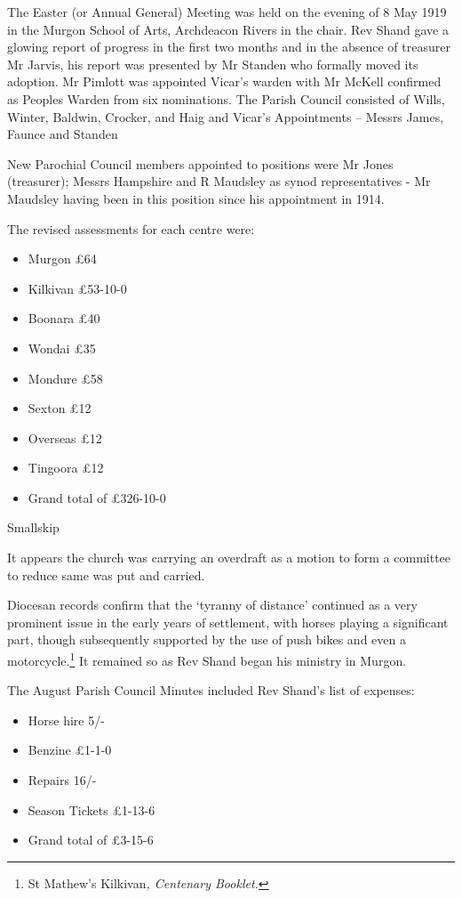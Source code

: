 The Easter (or Annual General) Meeting was held on the evening of 8 May 1919 in the Murgon School of Arts, Archdeacon Rivers in the chair. Rev Shand gave a glowing report of progress in the first two months and in the absence of treasurer Mr Jarvis, his report was presented by Mr Standen who formally moved its adoption. Mr Pimlott was appointed Vicar's warden with Mr McKell confirmed as Peoples Warden from six nominations. The Parish Council consisted of Wills, Winter, Baldwin, Crocker, and Haig and Vicar's Appointments -- Messrs James, Faunce and Standen

New Parochial Council members appointed to positions were Mr Jones (treasurer); Messrs Hampshire and R Maudsley as synod representatives - Mr Maudsley having been in this position since his appointment in 1914.

The revised assessments for each centre were:

\begin{itemize}
\item
  Murgon £64
\item
  Kilkivan £53-10-0
\item
  Boonara £40
\item
  Wondai £35
\item
  Mondure £58
\item
  Sexton £12
\item
  Overseas £12
\item
  Tingoora £12
\item
  Grand total of £326-10-0
\end{itemize}

Smallskip

It appears the church was carrying an overdraft as a motion to form a committee to reduce same was put and carried.

Diocesan records confirm that the `tyranny of distance' continued as a very prominent issue in the early years of settlement, with horses playing a significant part, though subsequently supported by the use of push bikes and even a motorcycle.\footnote{St Mathew's Kilkivan\emph{, Centenary Booklet.}} It remained so as Rev Shand began his ministry in Murgon.

The August Parish Council Minutes included Rev Shand's list of expenses:

\begin{itemize}
\item
  Horse hire 5/-
\item
  Benzine £1-1-0
\item
  Repairs 16/-
\item
  Season Tickets £1-13-6
\item
  Grand total of £3-15-6
\end{itemize}

